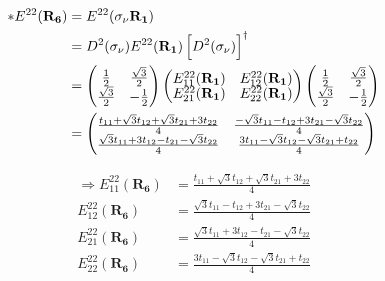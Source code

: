\documentclass{article}
\begin{document}
\begin{align*}
	\ast E^{22}(\mathbf{R_6}) & = E^{22}(\sigma_\nu\mathbf{ R_1})                                                                                               \\
	                          & = D^2(\sigma_\nu)  E^{22}(\mathbf{R_1}) \left[ D^2(\sigma_\nu) \right]^\dagger                                                  \\
	                          &
	=
	\begin{pmatrix}
		\renewcommand{\arraystretch}{0.72}
		\frac{1}{2}        & \frac{\sqrt{3}}{2} \\
		\frac{\sqrt{3}}{2} & -\frac{1}{2}
	\end{pmatrix}
	\begin{pmatrix}
		E_{11}^{22}(\mathbf{R_1}) & E_{12}^{22}(\mathbf{R_1}) \\
		E_{21}^{22}(\mathbf{R_1}) & E_{22}^{22}(\mathbf{R_1})
	\end{pmatrix}
	\begin{pmatrix}
		\frac{1}{2}        & \frac{\sqrt{3}}{2} \\
		\frac{\sqrt{3}}{2} & -\frac{1}{2}
	\end{pmatrix}                                                                                                     \\
	                          & = \begin{pmatrix}
		                              \frac{t_{11} + \sqrt{3}t_{12} + \sqrt{3}t_{21} + 3t_{22}}{4} & \frac{-\sqrt{3}t_{11} - t_{12} + 3 t_{21} - \sqrt{3}t_{22}}{4} \\
		                              \frac{\sqrt{3}t_{11} + 3t_{12} - t_{21} - \sqrt{3}t_{22}}{4} & \frac{3t_{11} - \sqrt{3}t_{12} - \sqrt{3}t_{21} + t_{22}}{4}
	                              \end{pmatrix}
\end{align*}

\begin{align*}
	\Rightarrow E_{11}^{22}(\mathbf{R_6}) & =  \frac{t_{11} + \sqrt{3}t_{12} + \sqrt{3}t_{21} + 3t_{22}}{4} \\
	E_{12}^{22}(\mathbf{R_6})             & = \frac{\sqrt{3}t_{11} - t_{12} + 3 t_{21} - \sqrt{3}t_{22}}{4} \\
	E_{21}^{22}(\mathbf{R_6})             & = \frac{\sqrt{3}t_{11} + 3t_{12} - t_{21} - \sqrt{3}t_{22}}{4}  \\
	E_{22}^{22}(\mathbf{R_6})             & = \frac{3t_{11} - \sqrt{3}t_{12} - \sqrt{3}t_{21} + t_{22}}{4}  \\
\end{align*}
\end{document}
